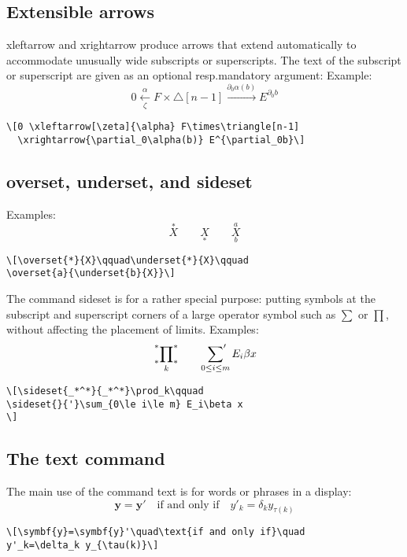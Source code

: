 \documentclass{article}
\newcommand{\ntt}{\normalfont\ttfamily}
\newcommand{\cn}[1]{{\protect\ntt\bslash#1}}
\theoremstyle{definition}
\theoremstyle{remark}
\begin{document}
\subsection{Extensible arrows}
\cn{xleftarrow} and \cn{xrightarrow} produce
arrows that extend automatically to accommodate unusually wide
subscripts or superscripts.  The text of the subscript or superscript
are given as an optional resp.\@ mandatory argument:
Example:
\[0 \xleftarrow[\zeta]{\alpha} F\times\triangle[n-1]
  \xrightarrow{\partial_0\alpha(b)} E^{\partial_0b}\]
\begin{verbatim}
\[0 \xleftarrow[\zeta]{\alpha} F\times\triangle[n-1]
  \xrightarrow{\partial_0\alpha(b)} E^{\partial_0b}\]
\end{verbatim}

\subsection{\cn{overset}, \cn{underset}, and \cn{sideset}}
Examples:
\[\overset{*}{X}\qquad\underset{*}{X}\qquad
\overset{a}{\underset{b}{X}}\]
\begin{verbatim}
\[\overset{*}{X}\qquad\underset{*}{X}\qquad
\overset{a}{\underset{b}{X}}\]
\end{verbatim}

The command \cn{sideset} is for a rather special
purpose: putting symbols at the subscript and superscript
corners of a large operator symbol such as $\sum$ or $\prod$,
without affecting the placement of limits.
Examples:
\[\sideset{_*^*}{_*^*}\prod_k\qquad
\sideset{}{'}\sum_{0\le i\le m} E_i\beta x
\]
\begin{verbatim}
\[\sideset{_*^*}{_*^*}\prod_k\qquad
\sideset{}{'}\sum_{0\le i\le m} E_i\beta x
\]
\end{verbatim}

\subsection{The \cn{text} command}
The main use of the command \cn{text} is for words or phrases in a
display:
\[\symbf{y}=\symbf{y}'\quad\text{if and only if}\quad
y'_k=\delta_k y_{\tau(k)}\]
\begin{verbatim}
\[\symbf{y}=\symbf{y}'\quad\text{if and only if}\quad
y'_k=\delta_k y_{\tau(k)}\]
\end{verbatim}
\end{document}
